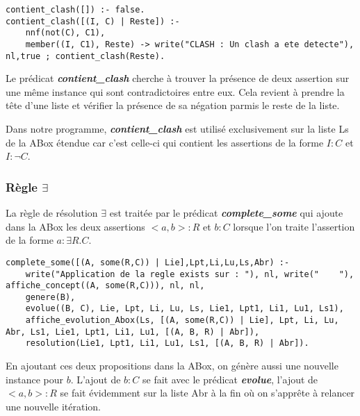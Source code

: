\documentclass{rapportECL}
\begin{document}
\begin{lstlisting}[style=prologStyle, caption={Verification de clash dans la ABox}, label={clash}]
contient_clash([]) :- false.
contient_clash([(I, C) | Reste]) :-
    nnf(not(C), C1),
    member((I, C1), Reste) -> write("CLASH : Un clash a ete detecte"), nl,true ; contient_clash(Reste).
\end{lstlisting}

Le prédicat \textbf{\textit{contient\_clash}} cherche à trouver la présence de deux assertion sur une même instance qui sont contradictoires entre eux. Cela revient à prendre la tête d'une liste et vérifier la présence de sa négation parmis le reste de la liste.

Dans notre programme, \textbf{\textit{contient\_clash}} est utilisé exclusivement sur la liste Ls de la ABox étendue car c'est celle-ci qui contient les assertions de la forme \textit{\(I : C\)} et \textit{\(I : \neg C\)}.

\subsubsection{Règle \(\exists\)}

La règle de résolution \textit{\( \exists \)} est traitée par le prédicat \textbf{\textit{complete\_some}} qui ajoute dans la ABox les deux assertions \textit{\( <a,b> : R \)} et \textit{\( b : C \)} lorsque l'on traite l'assertion de la forme \textit{\( a : \exists R.C \)}.

\newpage

\begin{lstlisting}[style=prologStyle, caption={Application de la regle \(\exists\)}, label={exists}]
complete_some([(A, some(R,C)) | Lie],Lpt,Li,Lu,Ls,Abr) :-
    write("Application de la regle exists sur : "), nl, write("    "), affiche_concept((A, some(R,C))), nl, nl,
    genere(B),
    evolue((B, C), Lie, Lpt, Li, Lu, Ls, Lie1, Lpt1, Li1, Lu1, Ls1),
    affiche_evolution_Abox(Ls, [(A, some(R,C)) | Lie], Lpt, Li, Lu, Abr, Ls1, Lie1, Lpt1, Li1, Lu1, [(A, B, R) | Abr]),
    resolution(Lie1, Lpt1, Li1, Lu1, Ls1, [(A, B, R) | Abr]).
\end{lstlisting}

En ajoutant ces deux propositions dans la ABox, on génère aussi une nouvelle instance pour \textit{\( b \)}. L'ajout de \textit{\( b : C \)} se fait avec le prédicat \textbf{\textit{evolue}}, l'ajout de \textit{\( <a,b> : R \)} se fait évidemment sur la liste Abr à la fin où on s'apprête à relancer une nouvelle itération.
\end{document}
